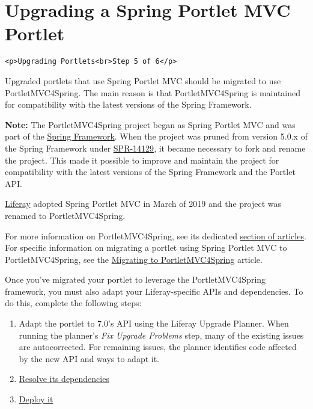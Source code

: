 \chapter{Upgrading a Spring Portlet MVC
Portlet}\label{upgrading-a-spring-portlet-mvc-portlet}

\begin{verbatim}
<p>Upgrading Portlets<br>Step 5 of 6</p>
\end{verbatim}

Upgraded portlets that use Spring Portlet MVC should be migrated to use
PortletMVC4Spring. The main reason is that PortletMVC4Spring is
maintained for compatibility with the latest versions of the Spring
Framework.

\noindent\hrulefill

\textbf{Note:} The PortletMVC4Spring project began as Spring Portlet MVC
and was part of the
\href{https://spring.io/projects/spring-framework}{Spring Framework}.
When the project was pruned from version 5.0.x of the Spring Framework
under
\href{https://github.com/spring-projects/spring-framework/issues/18701}{SPR-14129},
it became necessary to fork and rename the project. This made it
possible to improve and maintain the project for compatibility with the
latest versions of the Spring Framework and the Portlet API.

\noindent\hrulefill

\noindent\hrulefill

\href{http://www.liferay.com/}{Liferay} adopted Spring Portlet MVC in
March of 2019 and the project was renamed to PortletMVC4Spring.

\noindent\hrulefill

For more information on PortletMVC4Spring, see its dedicated
\href{/docs/7-2/appdev/-/knowledge_base/a/portletmvc4spring}{section of
articles}. For specific information on migrating a portlet using Spring
Portlet MVC to PortletMVC4Spring, see the
\href{/docs/7-2/appdev/-/knowledge_base/a/migrating-to-portletmvc4spring}{Migrating
to PortletMVC4Spring} article.

Once you've migrated your portlet to leverage the PortletMVC4Spring
framework, you must also adapt your Liferay-specific APIs and
dependencies. To do this, complete the following steps:

\begin{enumerate}
\def\labelenumi{\arabic{enumi}.}
\item
  Adapt the portlet to 7.0's API using the Liferay Upgrade Planner. When
  running the planner's \emph{Fix Upgrade Problems} step, many of the
  existing issues are autocorrected. For remaining issues, the planner
  identifies code affected by the new API and ways to adapt it.
\item
  \href{/docs/7-2/tutorials/-/knowledge_base/t/resolving-a-projects-dependencies}{Resolve
  its dependencies}
\item
  \href{/docs/7-2/reference/-/knowledge_base/r/deploying-a-project}{Deploy
  it}
\end{enumerate}


